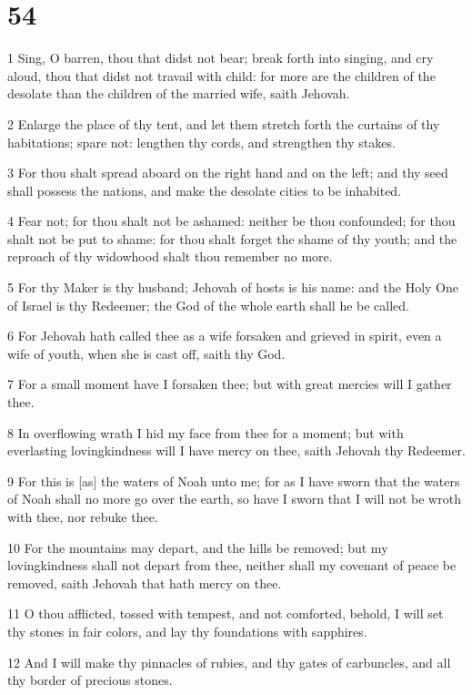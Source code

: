 \chapter{54}

\par 1 Sing, O barren, thou that didst not bear; break forth into singing, and cry aloud, thou that didst not travail with child: for more are the children of the desolate than the children of the married wife, saith Jehovah.
\par 2 Enlarge the place of thy tent, and let them stretch forth the curtains of thy habitations; spare not: lengthen thy cords, and strengthen thy stakes.
\par 3 For thou shalt spread aboard on the right hand and on the left; and thy seed shall possess the nations, and make the desolate cities to be inhabited.
\par 4 Fear not; for thou shalt not be ashamed: neither be thou confounded; for thou shalt not be put to shame: for thou shalt forget the shame of thy youth; and the reproach of thy widowhood shalt thou remember no more.
\par 5 For thy Maker is thy husband; Jehovah of hosts is his name: and the Holy One of Israel is thy Redeemer; the God of the whole earth shall he be called.
\par 6 For Jehovah hath called thee as a wife forsaken and grieved in spirit, even a wife of youth, when she is cast off, saith thy God.
\par 7 For a small moment have I forsaken thee; but with great mercies will I gather thee.
\par 8 In overflowing wrath I hid my face from thee for a moment; but with everlasting lovingkindness will I have mercy on thee, saith Jehovah thy Redeemer.
\par 9 For this is [as] the waters of Noah unto me; for as I have sworn that the waters of Noah shall no more go over the earth, so have I sworn that I will not be wroth with thee, nor rebuke thee.
\par 10 For the mountains may depart, and the hills be removed; but my lovingkindness shall not depart from thee, neither shall my covenant of peace be removed, saith Jehovah that hath mercy on thee.
\par 11 O thou afflicted, tossed with tempest, and not comforted, behold, I will set thy stones in fair colors, and lay thy foundations with sapphires.
\par 12 And I will make thy pinnacles of rubies, and thy gates of carbuncles, and all thy border of precious stones.
